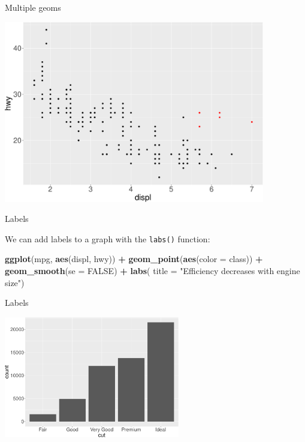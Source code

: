 \documentclass[ignorenonframetext,]{beamer}
\newenvironment{Shaded}{\begin{snugshade}}{\end{snugshade}}
\newcommand{\DataTypeTok}[1]{\textcolor[rgb]{0.13,0.29,0.53}{#1}}
\newcommand{\KeywordTok}[1]{\textcolor[rgb]{0.13,0.29,0.53}{\textbf{#1}}}
\newcommand{\NormalTok}[1]{#1}
\newcommand{\OperatorTok}[1]{\textcolor[rgb]{0.81,0.36,0.00}{\textbf{#1}}}
\newcommand{\OtherTok}[1]{\textcolor[rgb]{0.56,0.35,0.01}{#1}}
\newcommand{\StringTok}[1]{\textcolor[rgb]{0.31,0.60,0.02}{#1}}
\begin{document}
\begin{frame}{Multiple geoms}
\protect\hypertarget{multiple-geoms-34}{}

\begin{center}\includegraphics[height=300px]{data-visualization_files/figure-beamer/unnamed-chunk-111-1} \end{center}

\end{frame}

\begin{frame}[fragile]{Labels}
\protect\hypertarget{labels}{}

We can add labels to a graph with the \texttt{labs()} function:

\begin{Shaded}
\begin{Highlighting}[]
\KeywordTok{ggplot}\NormalTok{(mpg, }\KeywordTok{aes}\NormalTok{(displ, hwy)) }\OperatorTok{+}
\StringTok{  }\KeywordTok{geom_point}\NormalTok{(}\KeywordTok{aes}\NormalTok{(}\DataTypeTok{color =}\NormalTok{ class)) }\OperatorTok{+}
\StringTok{  }\KeywordTok{geom_smooth}\NormalTok{(}\DataTypeTok{se =} \OtherTok{FALSE}\NormalTok{) }\OperatorTok{+}
\StringTok{  }\KeywordTok{labs}\NormalTok{(}
    \DataTypeTok{title =} \StringTok{"Efficiency decreases with engine size"}\NormalTok{)}
\end{Highlighting}
\end{Shaded}

\end{frame}

\begin{frame}{Labels}
\protect\hypertarget{labels-1}{}

\begin{center}\includegraphics[height=200px]{data-visualization_files/figure-beamer/unnamed-chunk-113-1} \end{center}

\end{frame}
\end{document}
